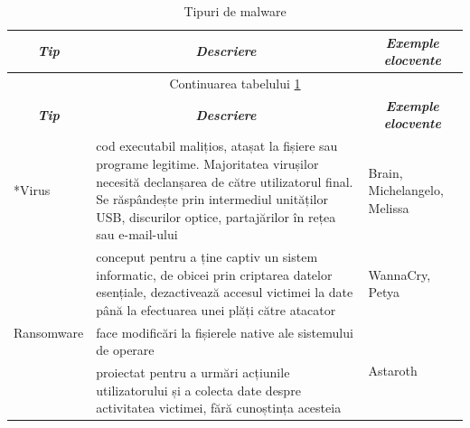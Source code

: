 \begin{longtable}[c]{|l|p{6cm}|p{2cm}|}
	\caption{Tipuri de malware\label{tab_tipuri_de_malware}}\\
	
	\hline
	\multicolumn{1}{|c|}{\textbf{\textit{Tip}}} & 
	\multicolumn{1}{c}{\textbf{\textit{Descriere}}} & 
	\multicolumn{1}{|c|}{\textbf{\textit{Exemple elocvente}}}  \\
	\hline
	\endfirsthead
	
	\multicolumn{3}{c}{Continuarea tabelului \ref{tab_tipuri_de_malware}}\\
	\hline
	\multicolumn{1}{|c|}{\textbf{\textit{Tip}}} & 
	\multicolumn{1}{c}{\textbf{\textit{Descriere}}} & 
	\multicolumn{1}{|c|}{\textbf{\textit{Exemple elocvente}}}  \\
	\hline
	\endhead
	
	\hline
	\endfoot
	
	\hline
	\endlastfoot
	
	\multirow{8}*{Virus} &
	cod executabil malițios, atașat la fișiere sau programe legitime. Majoritatea virușilor necesită declanșarea de către utilizatorul final. Se răspândește prin intermediul unităților USB, discurilor optice, partajărilor în rețea sau e-mail-ului &
	\newline \newline Brain, \newline Michelangelo, \newline Melissa \\
	\hline

	\multirow{5}{*}{Ransomware} & 
	conceput pentru a ține captiv un sistem informatic, de obicei prin criptarea datelor esențiale, dezactivează accesul victimei la date până la efectuarea unei plăți către atacator & 
	\newline WannaCry, \newline Petya \\	
	\hline
	
	\multirow{2}{*}{Fileless Malware} & 
	face modificări la fișierele native ale sistemului de operare & 
	\multirow{2}{*}{Astaroth} \\ 
	\hline
	
	\multirow{4}{*}{Spyware} & 
	proiectat pentru a urmări acțiunile utilizatorului și a colecta date despre activitatea victimei, fără cunoștința acesteia & 
	\multirow{4}{*}{DarkHotel} \\ 
	\hline
	

\end{longtable}

